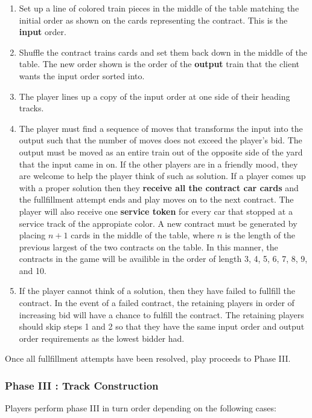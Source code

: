 \documentclass[12pt, letterpaper]{article}
\begin{document}
\begin{enumerate}
\item Set up a line of colored train pieces in the middle of the table matching the initial order as shown on the cards representing the contract. This is the \textbf{input}  order.
\item Shuffle the contract trains cards and set them back down in the middle of the table. The new order shown is the order of the \textbf{output} train that the client wants the input order sorted into.
\item The player lines up a copy of the input order at one side of their heading tracks.
\item The player must find a sequence of moves that transforms the input into the output such that the number of moves does not exceed the player's bid. The output must be moved as an entire train out of the opposite side of the yard that the input came in on. If the other players are in a friendly mood, they are welcome to help the player think of such as solution. If a player comes up with a proper solution then they \textbf{receive all the contract car cards} and the fullfillment attempt ends and play moves on to the next contract. The player will also receive one \textbf{service token} for every car that stopped at a service track of the appropiate color. A new contract must be generated by placing $n + 1$ cards in the middle of the table, where $n$ is the length of the previous largest of the two contracts on the table. In this manner, the contracts in the game will be availible in the order of length 3, 4, 5, 6, 7, 8, 9, and 10.
\item If the player cannot think of a solution, then they have failed to fullfill the contract. In the event of a failed contract, the retaining players in order of increasing bid will have a chance to fulfill the contract.  The retaining players should skip steps 1 and 2 so that they have the same input order and output order requirements as the lowest bidder had.
\end{enumerate}

Once all fullfillment attempts have been resolved, play proceeds to Phase III.

\subsubsection{Phase III : Track Construction}

Players perform phase III in turn order depending on the following cases:
\end{document}
